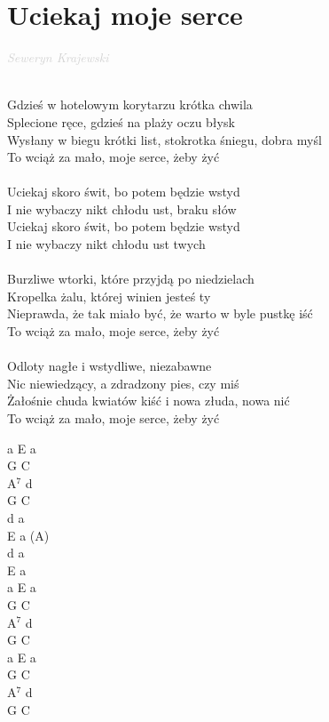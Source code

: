 \documentclass[a5paper, 10pt]{book}
\begin{document}
\newpage
\section{Uciekaj moje serce}\textcolor{lightgray}{\textit{Seweryn Krajewski
  }}\\~\\
\begin{minipage}[t]{0.8\textwidth}
  Gdzieś w hotelowym korytarzu krótka chwila\\
  Splecione ręce, gdzieś na plaży oczu błysk\\
  Wysłany w biegu krótki list, stokrotka śniegu, dobra myśl\\
  To wciąż za mało, moje serce, żeby żyć\\
  \\
  \hspace*{5mm}Uciekaj skoro świt, bo potem będzie wstyd\\
  \hspace*{5mm}I nie wybaczy nikt chłodu ust, braku słów \\
  \hspace*{5mm}Uciekaj skoro świt, bo potem będzie wstyd\\
  \hspace*{5mm}I nie wybaczy nikt chłodu ust twych\\
  \\
  Burzliwe wtorki, które przyjdą po niedzielach\\
  Kropelka żalu, której winien jesteś ty\\
  Nieprawda, że tak miało być, że warto w byle pustkę iść\\
  To wciąż za mało, moje serce, żeby żyć\\
  \\
  Odloty nagłe i wstydliwe, niezabawne\\
  Nic niewiedzący, a zdradzony pies, czy miś\\
  Żałośnie chuda kwiatów kiść i nowa złuda, nowa nić\\
  To wciąż za mało, moje serce, żeby żyć\\
\end{minipage}
\begin{minipage}[t]{0.2\textwidth}
  a E a\\
  G C\\
  A$^7$ d\\
  G C\\

  d a\\
  E a (A)\\
  d a\\
  E a\\

  a E a\\
  G C\\
  A$^7$ d\\
  G C\\

  a E a\\
  G C\\
  A$^7$ d\\
  G C\\
\end{minipage}
\end{document}
